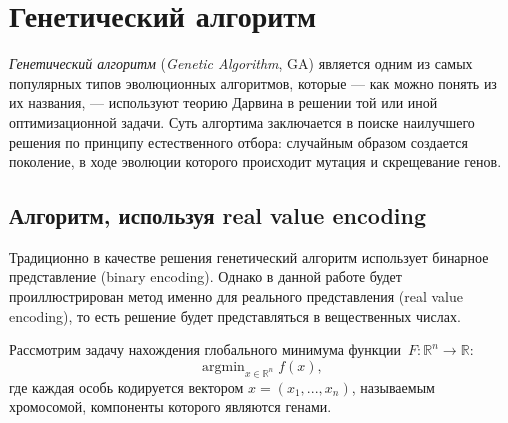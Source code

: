 \chapter{Генетический алгоритм} \label{ParticleSwarmOptimisation}
\noindent
\emph{Генетический алгоритм} (\emph{Genetic Algorithm}, GA) является одним из самых популярных типов эволюционных алгоритмов, которые — как можно понять из их названия, — используют теорию Дарвина в решении той или иной оптимизационной задачи. Суть алгортима заключается в поиске наилучшего решения по принципу естественного отбора: случайным образом создается поколение, в ходе эволюции которого происходит мутация и скрещевание генов.

\section{Алгоритм, используя real value encoding}
\noindent
Традиционно в качестве решения генетический алгоритм использует бинарное представление (binary encoding). Однако в данной работе будет проиллюстрирован метод именно для реального представления (real value encoding), то есть решение будет представляться в вещественных числах.

Рассмотрим задачу нахождения глобального минимума функции~$F \colon \mathbb{R}^n \to \mathbb{R}$:
\[
	\mathop{\mathrm{argmin}}_{x \in \mathbb{R}^n}f(x),
\]
где каждая особь кодируется вектором $x = (x_1, ..., x_n)$, называемым хромосомой, компоненты которого являются генами.


